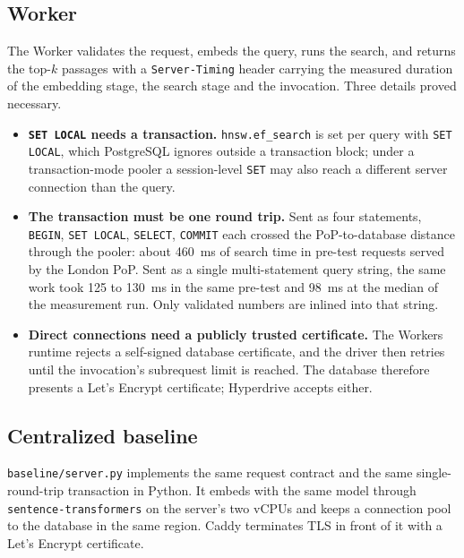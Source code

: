 \documentclass[conference]{IEEEtran}
\newcommand{\code}[1]{\texttt{#1}}
\begin{document}
\subsection{Worker}
The Worker validates the request, embeds the query, runs the search, and returns the top-$k$
passages with a \code{Server-Timing} header carrying the measured duration of the embedding stage,
the search stage and the invocation. Three details proved necessary.
\begin{itemize}
\item \textbf{\code{SET LOCAL} needs a transaction.} \code{hnsw.ef\_search} is set per query with
\code{SET LOCAL}, which PostgreSQL ignores outside a transaction block; under a transaction-mode
pooler a session-level \code{SET} may also reach a different server connection than the query.
\item \textbf{The transaction must be one round trip.} Sent as four statements, \code{BEGIN},
\code{SET LOCAL}, \code{SELECT}, \code{COMMIT} each crossed the PoP-to-database distance through
the pooler: about 460~ms of search time in pre-test requests served by the London PoP. Sent as a
single multi-statement query string, the same work took 125 to 130~ms in the same pre-test and
98~ms at the median of the measurement run. Only validated numbers are inlined into that string.
\item \textbf{Direct connections need a publicly trusted certificate.} The Workers runtime rejects
a self-signed database certificate, and the driver then retries until the invocation's subrequest
limit is reached. The database therefore presents a Let's Encrypt certificate; Hyperdrive accepts
either.
\end{itemize}

\subsection{Centralized baseline}
\code{baseline/server.py} implements the same request contract and the same single-round-trip
transaction in Python. It embeds with the same model through \code{sentence-transformers} on the
server's two vCPUs and keeps a connection pool to the database in the same region. Caddy
terminates TLS in front of it with a Let's Encrypt certificate.
\end{document}
